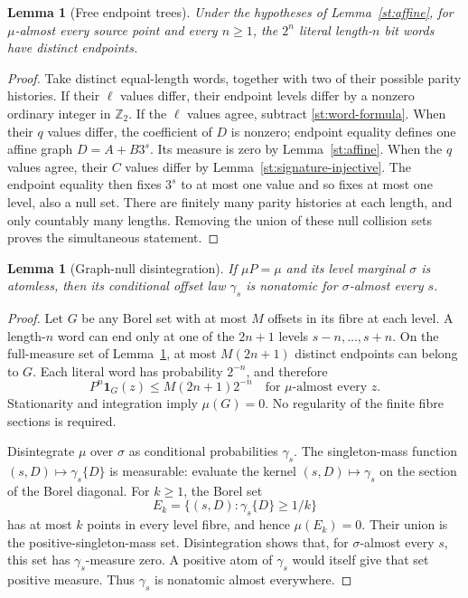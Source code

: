 \documentclass[11pt]{amsart}
\newtheorem{lemma}[theorem]{Lemma}
\theoremstyle{definition}
\theoremstyle{remark}
\newcommand{\Ztwo}{\mathbb Z_2}
\newcommand{\one}{\mathbf 1}
\begin{document}
\begin{lemma}[Free endpoint trees]\label{st:free-tree}
Under the hypotheses of Lemma~\ref{st:affine}, for $\mu$-almost every
source point and every $n\ge1$, the $2^n$ literal length-$n$ bit words
have distinct endpoints.
\end{lemma}
\begin{proof}
Take distinct equal-length words, together with two of their possible
parity histories.  If their $\ell$ values differ, their endpoint levels
differ by a nonzero ordinary integer in $\Ztwo$.  If the $\ell$ values
agree, subtract \eqref{st:word-formula}.  When their $q$ values differ,
the coefficient of $D$ is nonzero; endpoint equality defines one affine
graph $D=A+B3^s$.  Its measure is zero by Lemma~\ref{st:affine}.  When
the $q$ values agree, their $C$ values differ by
Lemma~\ref{st:signature-injective}.  The endpoint equality then fixes
$3^s$ to at most one value and so fixes at most one level, also a null
set.  There are finitely many parity histories at each length, and only
countably many lengths.  Removing the union of these null collision sets
proves the simultaneous statement.
\end{proof}

\begin{lemma}[Graph-null disintegration]\label{st:nonatomic}
If $\mu P=\mu$ and its level marginal $\sigma$ is atomless, then its
conditional offset law $\gamma_s$ is nonatomic for $\sigma$-almost every
$s$.
\end{lemma}
\begin{proof}
Let $G$ be any Borel set with at most $M$ offsets in its fibre at
each level.  A length-$n$ word can end only at one of the $2n+1$ levels
$s-n,\ldots,s+n$.  On the full-measure set of Lemma~\ref{st:free-tree},
at most $M(2n+1)$ distinct endpoints can belong to $G$.  Each literal
word has probability $2^{-n}$, and therefore
\[
 P^n\one_G(z)\le M(2n+1)2^{-n}\quad\text{for $\mu$-almost every }z.
\]
Stationarity and integration imply $\mu(G)=0$.  No regularity of the
finite fibre sections is required.

Disintegrate $\mu$ over $\sigma$ as conditional probabilities $\gamma_s$.
The singleton-mass function $(s,D)\mapsto\gamma_s\{D\}$ is measurable:
evaluate the kernel $(s,D)\mapsto\gamma_s$ on the section of the Borel
diagonal.  For $k\ge1$, the Borel set
\[
 E_k=\{(s,D):\gamma_s\{D\}\ge1/k\}
\]
has at most $k$ points in every level fibre, and hence $\mu(E_k)=0$.
Their union is the positive-singleton-mass set.  Disintegration shows
that, for $\sigma$-almost every $s$, this set has $\gamma_s$-measure
zero.  A positive atom of $\gamma_s$ would itself give that set positive
measure.  Thus $\gamma_s$ is nonatomic almost everywhere.
\end{proof}
\end{document}
